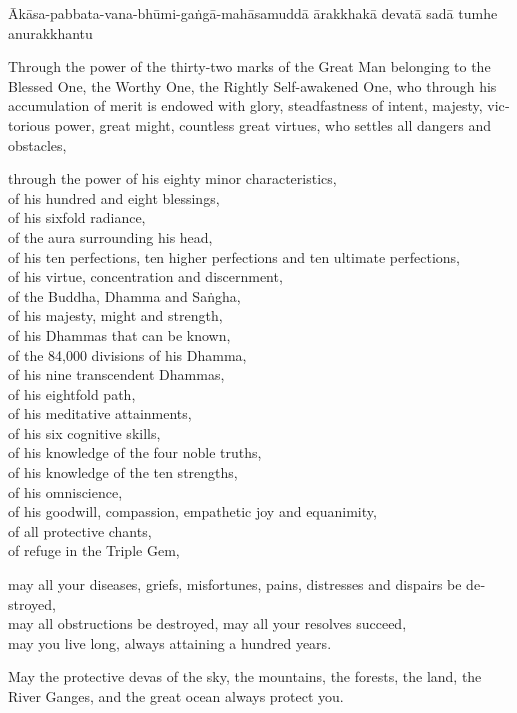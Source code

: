 Ākāsa-pabbata-vana-bhūmi-gaṅgā-mahāsamuddā ārakkhakā
devatā sadā tumhe anurakkhantu


\bigskip

\begin{english}
  \setlength{\parskip}{8pt}%
  Through the power of the thirty-two marks of the Great Man belonging to the
  Blessed One, the Worthy One, the Rightly Self-awakened One, who through his
  accumulation of merit is endowed with glory, steadfastness of intent, majesty,
  victorious power, great might, countless great virtues, who settles all
  dangers and obstacles,

  \clearpage

  through the power of his eighty minor characteristics,\\
  of his hundred and eight blessings,\\
  of his sixfold radiance,\\
  of the aura surrounding his head,\\
  of his ten perfections, ten higher perfections and ten ultimate perfections,\\
  of his virtue, concentration and discernment,\\
  of the Buddha, Dhamma and Saṅgha,\\
  of his majesty, might and strength,\\
  of his Dhammas that can be known,\\
  of the 84,000 divisions of his Dhamma,\\
  of his nine transcendent Dhammas,\\
  of his eightfold path,\\
  of his meditative attainments,\\
  of his six cognitive skills,\\
  of his knowledge of the four noble truths,\\
  of his knowledge of the ten strengths,\\
  of his omniscience,\\
  of his goodwill, compassion, empathetic joy and equanimity,\\
  of all protective chants,\\
  of refuge in the Triple Gem,

  may all your diseases, griefs, misfortunes, pains, distresses and dispairs be destroyed,\\
  may all obstructions be destroyed, may all your resolves succeed,\\
  may you live long, always attaining a hundred years.

  May the protective devas of the sky, the mountains, the forests, the land, the
  River Ganges, and the great ocean always protect you.
\end{english}

